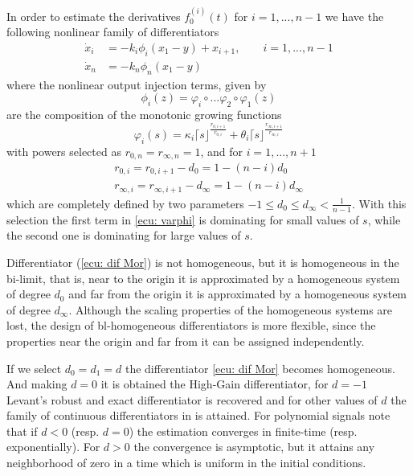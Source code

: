 \documentclass[11pt,letterpaper,twoside,openright]{report}
\begin{document}
In order to estimate the derivatives $f_0^{(i)}(t)$ for $i=1,...,n-1$ we have the following nonlinear family of differentiators
\begin{equation}\label{ecu: dif Mor}
	\begin{split}
	\dot{x}_i &= -k_i\phi_i(x_1-y)+x_{i+1}, \qquad i=1,...,n-1 \\
	\dot{x}_n &= -k_n\phi_n(x_1-y)
	\end{split}
\end{equation}
where the nonlinear output injection terms, given by
\begin{equation}
	\phi_i(z) = \varphi_i \circ ...\varphi_2 \circ \varphi_1(z)
\end{equation} 
are the composition of the monotonic growing functions
\begin{equation}\label{ecu: varphi}
	\varphi_i(s) = \kappa_i \lceil s \rfloor^{\frac{r_{0,i+1}}{r_{0,i}}} + \theta_i \lceil s \rfloor^{\frac{r_{\infty,i+1}}{r_{\infty,i}}} 
\end{equation}
with powers selected as $r_{0,n}=r_{\infty,n}=1$, and for $i=1,...,n+1$
\begin{equation}
	\begin{split}
	r_{0,i} = r_{0,i+1}-d_0 = 1-(n-i)d_0 \\
	r_{\infty,i} = r_{\infty,i+1}-d_\infty = 1-(n-i)d_\infty
	\end{split}
\end{equation}
which are completely defined by two parameters $-1 \leq d_0 \leq d_\infty < \frac{1}{n-1}$. With this selection the first term in \eqref{ecu: varphi} is dominating for small values of $s$, while the second one is dominating for large values of $s$.

Differentiator (\ref{ecu: dif Mor}) is not homogeneous, but it is homogeneous in the bi-limit, that is, near to the origin it is approximated by a homogeneous system of degree $d_0$ and far from the origin it is approximated by a homogeneous system of degree $d_\infty$. Although the scaling properties of the homogeneous systems are lost, the design of bl-homogeneous differentiators is more flexible, since the properties near the origin and far from it can be assigned independently.

If we select $d_0 = d_1 = d$ the differentiator \eqref{ecu: dif Mor} becomes homogeneous. And making $d = 0$ it is obtained the High-Gain differentiator, for $d = -1$ Levant’s robust and exact differentiator is recovered and for other values of $d$ the family of continuous differentiators in \cite{CruzZavala2016}\cite{Sanchez2018}\cite{CruzZavala2019}\cite{Jbara2021} is attained. For polynomial signals note that if $d < 0$ (resp. $d = 0$) the estimation converges in finite-time (resp. exponentially). For $d > 0$ the convergence is asymptotic, but it attains any neighborhood of zero in a time which is uniform in the initial conditions.
\end{document}
